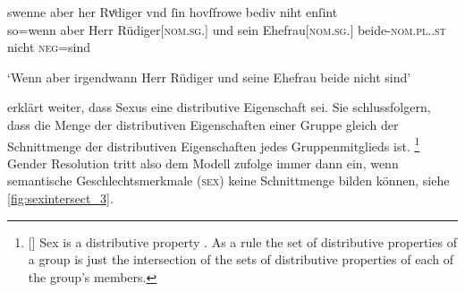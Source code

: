 \begin{exe}
\ex \label{ex:gendres2}
		\gll swenne aber her Rvͦdiger vnd ſin
			hovſfrowe bediv niht enſint\\
			so=wenn aber Herr Rüdiger[\textsc{nom.sg.\MascM}] und sein
			Ehefrau[\textsc{nom.sg.\FemF}] beide-\textsc{nom.pl.\NeutMF.st} nicht
			\textsc{neg}=sind\\
		\begin{taggedline}{\parencites(Regensburg, 1299)[\pno~3262, 425.13--14]{cao4}}
		\trans `Wenn aber irgendwann Herr Rüdiger und seine Ehefrau
			beide nicht  sind'
		\end{taggedline}
\end{exe}

\citet[576]{wechsler2009} \citep[vgl.~auch][182]{wechslerzlatic2003} erklärt
weiter, dass Sexus eine distributive Eigenschaft sei. Sie schlussfolgern, dass
die Menge der distributiven Eigenschaften einer Gruppe gleich der Schnittmenge
der distributiven Eigenschaften jedes Gruppenmitglieds ist.%
%
	\footnote{[{\cites[576]{wechsler2009}[vgl.][182]{wechslerzlatic2003}}]{%
		Sex is a distributive property \textelp{}. As a rule the set of
		distributive properties of a group is just the intersection of the sets
		of distributive properties of each of the group's members}.
	}
%
Gender Resolution tritt also dem Modell zufolge immer dann ein, wenn
semantische Geschlechtsmerkmale (\textsc{sex}) keine Schnittmenge bilden können, siehe
\cref{fig:sexintersect_3}.

